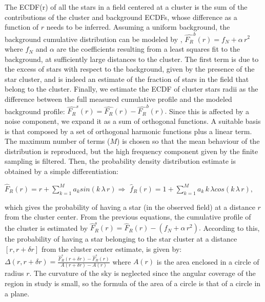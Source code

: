 \documentclass[11pt,twoside
]{article}
\begin{document}
The ECDF(r) of all the stars in a field centered at a cluster is the
sum of the contributions of the cluster and background ECDFs, whose
difference as a function of $r$ needs to be inferred.   Assuming a uniform background, the background cumulative distribution can be modeled by                                      ,
\(\displaystyle   \hat{F_R}^b(r) = f_N + \alpha \,r^2  \)
where $f_N$ and $\alpha$ are the coefficients resulting from a least squares fit to the background, at sufficiently large distances to the cluster. The first term is due to the excess of stars with respect to the background, given by the presence of the star cluster, and is indeed an estimate of the fraction of stars in the field that belong to the cluster.   Finally, we estimate the ECDF of cluster stars radii as the difference between the full measured cumulative profile and the modeled background profile:
%
\(\displaystyle   \hat{F_R}^s(r) = \hat{F_R}(r) - \hat{F_R}^b(r).  \)
%
Since this is affected by a noise component, we expand it as a sum of
orthogonal functions. A suitable basis is that composed by a set of
orthogonal harmonic functions plus a linear term.  The maximum number
of terms ($M$) is chosen so that the mean behaviour of the distribution is
reproduced, but the high frequency component given by the finite
sampling is filtered.   Then, the probability density distribution
estimate is obtained by a simple differentiation:

\(\displaystyle   \hat{F}_R(r) = r + \sum_{k=1}^{M} a_k sin(k \,\lambda\, r)
\Rightarrow \)
\(\displaystyle   \hat{f}_R(r) = 1 +  \sum_{k=1}^{M} a_k\,k\,\lambda cos(k
\,\lambda\, r),  \)

\noindent
which gives the probability of having a star (in the observed field)
at a distance $r$ from the cluster center.
%
From the previous equations, the cumulative profile of the cluster is
estimated by \(\displaystyle   \hat{F}_R^s(r) = \hat{F}_R(r) - (f_N +
\alpha\,r^2). \)
%
According to this, the probability of having a star belonging to the
star cluster at a distance $[r, r+\delta r]$          
from the cluster center estimate, is given by:
% 
\(\displaystyle   \Delta(r, r+\delta r) = \frac{\hat{F}^s_R(r+\delta r) - \hat{F}^s_R(r)} {A(r+\delta r) -A(r)}   \)
%
\noindent
%
where $A(r)$ is the area enclosed in a circle of radius $r$. The curvature of the sky is neglected since the angular coverage of the region in study is small, so the formula of the area of a circle is that of a circle in a plane. 
%
 
\end{document}
